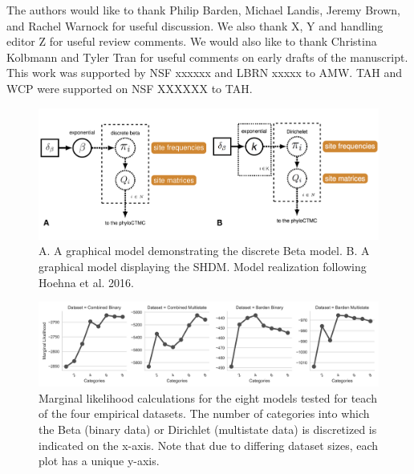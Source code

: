 \documentclass[]{article}
\begin{document}
The authors would like to thank Philip Barden, Michael Landis, Jeremy Brown, and Rachel Warnock	 for useful discussion.
We also thank X, Y and handling editor Z for useful review comments.
We would also like to thank Christina Kolbmann and Tyler Tran for useful comments on early drafts of the manuscript.
This work was supported by NSF xxxxxx and LBRN xxxxx to AMW.
TAH and WCP were supported on NSF XXXXXX to TAH.





\begin{figure}
  \caption{A. A graphical model demonstrating the discrete Beta model. B. A graphical model displaying the SHDM. Model realization following Hoehna et al. 2016.}
    \includegraphics[scale=0.35]{fig/1AB}
\end{figure} 


\begin{figure}
  \caption{Marginal likelihood calculations for the eight models tested for teach of the four empirical datasets. The number of categories into which the Beta (binary data) or Dirichlet (multistate data) is discretized is indicated on the x-axis. Note that due to differing dataset sizes, each plot has a unique y-axis.}
    \includegraphics[scale=0.5]{fig/SS_plot_nostar}
\end{figure} 
\end{document}
